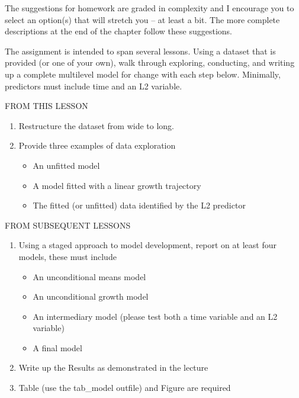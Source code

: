 \documentclass[
  11pt,
]{book}
\providecommand{\tightlist}{%
  \setlength{\itemsep}{0pt}\setlength{\parskip}{0pt}}
\begin{document}
The suggestions for homework are graded in complexity and I encourage you to select an option(s) that will stretch you -- at least a bit. The more complete descriptions at the end of the chapter follow these suggestions.

The assignment is intended to span several lessons. Using a dataset that is provided (or one of your own), walk through exploring, conducting, and writing up a complete multilevel model for change with each step below. Minimally, predictors must include time and an L2 variable.

FROM THIS LESSON

\begin{enumerate}
\def\labelenumi{\arabic{enumi}.}
\tightlist
\item
  Restructure the dataset from wide to long.
\item
  Provide three examples of data exploration

  \begin{itemize}
  \tightlist
  \item
    An unfitted model
  \item
    A model fitted with a linear growth trajectory
  \item
    The fitted (or unfitted) data identified by the L2 predictor
  \end{itemize}
\end{enumerate}

FROM SUBSEQUENT LESSONS

\begin{enumerate}
\def\labelenumi{\arabic{enumi}.}
\setcounter{enumi}{2}
\tightlist
\item
  Using a staged approach to model development, report on at least four models, these must include

  \begin{itemize}
  \tightlist
  \item
    An unconditional means model
  \item
    An unconditional growth model
  \item
    An intermediary model (please test both a time variable and an L2 variable)
  \item
    A final model
  \end{itemize}
\item
  Write up the Results as demonstrated in the lecture
\item
  Table (use the tab\_model outfile) and Figure are required
\end{enumerate}
\end{document}
